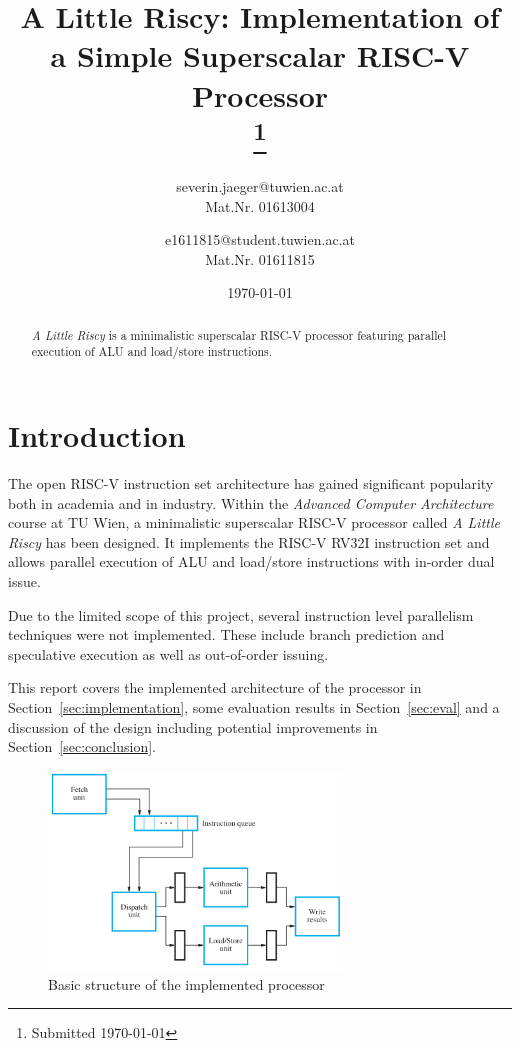 \documentclass[conference]{IEEEtran}
\begin{document}
\title{A Little Riscy: Implementation of a Simple Superscalar RISC-V Processor\\
{
\thanks{Submitted \today}
}
}

\date{\today}

\author{
severin.jaeger@tuwien.ac.at\\
Mat.Nr. 01613004\\

\and
{}
e1611815@student.tuwien.ac.at\\
Mat.Nr. 01611815\\
}

\maketitle

\begin{abstract}
\emph{A Little Riscy} is a minimalistic superscalar RISC-V processor featuring parallel execution of ALU and load/store instructions.
\end{abstract}

\section{Introduction}
The open RISC-V instruction set architecture \cite{risc-v} has gained significant popularity both in academia and in industry. Within the \emph{Advanced Computer Architecture} course at TU Wien, a minimalistic superscalar RISC-V processor called \emph{A Little Riscy} has been designed. It implements the RISC-V RV32I instruction set and allows parallel execution of ALU and load/store instructions with in-order dual issue.

Due to the limited scope of this project, several instruction level parallelism techniques were not implemented. These include branch prediction and speculative execution as well as out-of-order issuing.

This report covers the implemented architecture of the processor in Section~\ref{sec:implementation}, some evaluation results in Section~\ref{sec:eval} and a discussion of the design including potential improvements in Section~\ref{sec:conclusion}.

\begin{figure}[h]
	\centering
	\includegraphics[width=7.8cm]{basic_architecture.PNG}
	\caption{Basic structure of the implemented processor \cite{Hamacher}}
	\label{fig:basic_arch}
\end{figure}
\end{document}

